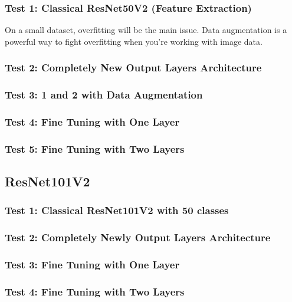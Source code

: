 \subsubsection{Test 1: Classical ResNet50V2 (Feature Extraction)}
On a small dataset, overfitting will be the main issue. Data augmentation is a powerful way to fight overfitting when you’re working with image data.

\subsubsection{Test 2: Completely New Output Layers Architecture}

\subsubsection{Test 3: 1 and 2 with Data Augmentation}

\subsubsection{Test 4: Fine Tuning with One Layer}

\subsubsection{Test 5: Fine Tuning with Two Layers}







\subsection{ResNet101V2}

\subsubsection{Test 1: Classical ResNet101V2 with 50 classes}

\subsubsection{Test 2: Completely Newly Output Layers Architecture}

\subsubsection{Test 3: Fine Tuning with One Layer}

\subsubsection{Test 4: Fine Tuning with Two Layers}







